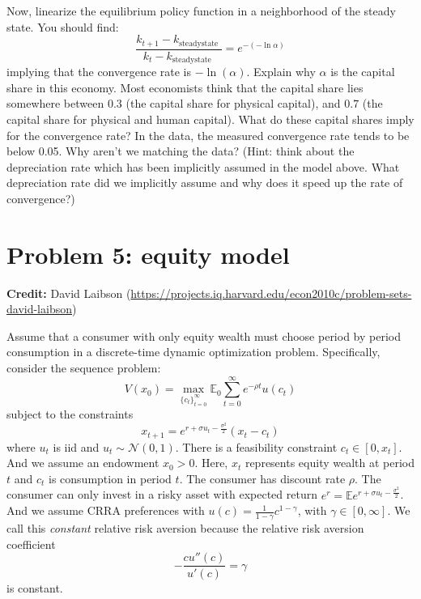 \documentclass[11pt]{extarticle}
\theoremstyle{plain}
\theoremstyle{definition}
\begin{document}
Now, linearize the equilibrium policy function in a neighborhood of the steady state. You should find:
$$
\frac{k_{t+1}-k_{\text {steadystate }}}{k_t-k_{\text {steadystate }}}=e^{-(-\ln \alpha)}
$$
implying that the convergence rate is $-\ln (\alpha)$. Explain why $\alpha$ is the capital share in this economy. Most economists think that the capital share lies somewhere between $0.3$ (the capital share for physical capital), and $0.7$ (the capital share for physical and human capital). What do these capital shares imply for the convergence rate? In the data, the measured convergence rate tends to be below 0.05. Why aren't we matching the data? (Hint: think about the depreciation rate which has been implicitly assumed in the model above. What depreciation rate did we implicitly assume and why does it speed up the rate of convergence?)


\vspace{10mm}
\section*{Problem 5: equity model}

\textbf{Credit:} David Laibson (\url{https://projects.iq.harvard.edu/econ2010c/problem-sets-david-laibson})

\vspace{5mm}
\noindent
Assume that a consumer with only equity wealth must choose period by period consumption in a discrete-time dynamic optimization problem. Specifically, consider the sequence problem:
\begin{equation*}
	V(x_0) = \max_{ \{ c_t \}_{t=0}^\infty } \mathbb E_0 \sum_{t=0}^\infty e^{- \rho t} u(c_t)
\end{equation*}
subject to the constraints
\begin{equation*}
	x_{t+1} = e^{r + \sigma u_t - \frac{\sigma^2}{2}} (x_t - c_t)
\end{equation*}
where $u_t$ is iid and $u_t \sim \mathcal N(0, 1)$. There is a feasibility constraint $c_t \in [0, x_t]$. And we assume an endowment $x_0 > 0$. Here, $x_t$ represents equity wealth at period $t$ and $c_t$ is consumption in period $t$. The consumer has discount rate $\rho$. The consumer can only invest in a risky asset with expected return $e^r = \mathbb E e^{r + \sigma u_t - \frac{\sigma^2}{2}}$. And we assume CRRA preferences with $u(c) = \frac{1}{1-\gamma} c^{1-\gamma}$, with $\gamma \in [0, \infty]$. We call this \textit{constant} relative risk aversion because the relative risk aversion coefficient
\begin{equation*}
	- \frac{c u''(c)}{u'(c)} = \gamma
\end{equation*}
is constant. 
\end{document}
